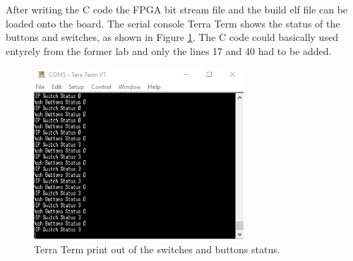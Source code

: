 After writing the C code the FPGA bit stream file and the build elf file can be loaded onto the board. The serial console Terra Term shows the status of the buttons and switches, as shown in Figure \ref{fig: Vivado_lab4_TT_PartII}. The C code could basically used entyrely from the former lab and only the lines 17 and 40 had to be added.
\begin{figure}[H]
	\centering
	\includegraphics[width=0.7\textwidth]{01_images/Vivado_lab4_TT_PartII.PNG}
	\caption{Terra Term print out of the switches and buttons status.}
	\label{fig: Vivado_lab4_TT_PartII}
\end{figure}

